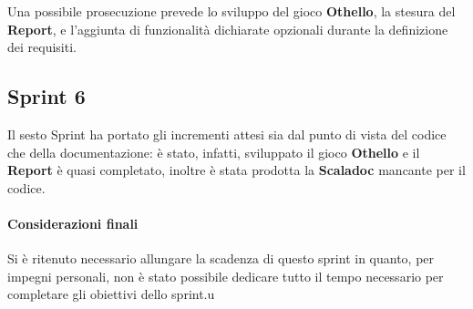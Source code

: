 Una possibile prosecuzione prevede lo sviluppo del gioco \textbf{Othello}, la stesura del \textbf{Report}, e l'aggiunta di funzionalità dichiarate opzionali durante la definizione dei requisiti.

\subsection{Sprint 6}
%
Il sesto Sprint ha portato gli incrementi attesi sia dal punto di vista del codice che della documentazione: è stato, infatti, sviluppato il gioco \textbf{Othello} e il \textbf{Report} è quasi completato, inoltre è stata prodotta la \textbf{Scaladoc} mancante per il codice.
%
\paragraph{Considerazioni finali}
%
Si è ritenuto necessario allungare la scadenza di questo sprint in quanto, per impegni personali, non è stato possibile dedicare tutto il tempo necessario per completare gli obiettivi dello sprint.u